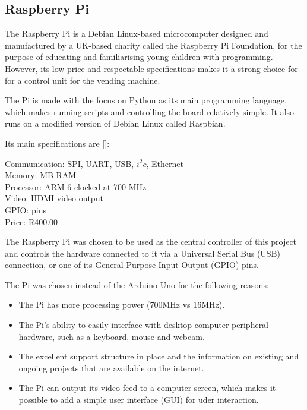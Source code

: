 \subsection{Raspberry Pi}

The Raspberry Pi is a Debian Linux-based microcomputer
designed and manufactured by a UK-based charity called the Raspberry Pi Foundation, for the
purpose of educating and familiarising young children with programming. However, its low price
and respectable specifications makes it a strong choice for for a control unit for the vending
machine.

The Pi is made with the focus on Python as its main programming language, which makes running
scripts and controlling the board relatively simple. It also runs on a modified version of
Debian Linux called Raspbian.

Its main specifications are [\cite{website:raspi-specs}]:

\begin{tabbing}

Communication: \= SPI, UART, USB, $i^2c$, Ethernet \\ 
Memory:  MB RAM \\
Processor: \> ARM 6 clocked at 700 MHz \\
Video: \> HDMI video output \\
GPIO:  pins \\
Price: \> R400.00 \\

\end{tabbing} 

The Raspberry Pi was chosen to be used as the central controller of this project and
controls the hardware connected to it via a Universal Serial Bus (USB) connection, or one of
its General Purpose Input Output (GPIO) pins.

The Pi was chosen instead of the Arduino Uno for the following reasons:

\begin{itemize}
  
  \item The Pi has more processing power (700MHz vs 16MHz).
  \item The Pi's ability to easily interface with desktop computer peripheral hardware,
  such as a keyboard, mouse and webcam.
  \item The excellent support structure in place and the information on existing and ongoing
  projects that are available on the internet.
  \item The Pi can output its video feed to a computer screen, which makes it possible to
  add a simple user interface (GUI) for uder interaction. 

\end{itemize}

